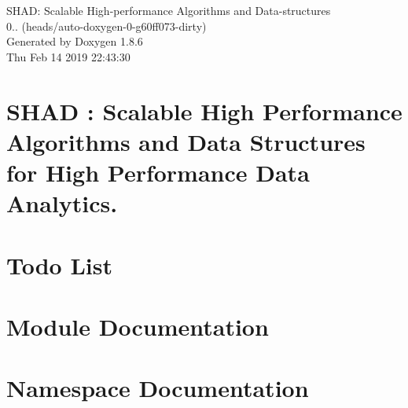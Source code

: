 \documentclass[twoside]{book}
\newcommand{\clearemptydoublepage}{%
  \newpage{\pagestyle{empty}\cleardoublepage}%
}
\begin{document}
\hypersetup{pageanchor=false}
\begin{titlepage}
\vspace*{7cm}
\begin{center}%
{\Large S\-H\-A\-D\-: Scalable High-\/performance Algorithms and Data-\/structures \\[1ex]\large 0.. (heads/auto-\/doxygen-\/0-\/g60ff073-\/dirty) }\\
\vspace*{1cm}
{\large Generated by Doxygen 1.8.6}\\
\vspace*{0.5cm}
{\small Thu Feb 14 2019 22:43:30}\\
\end{center}
\end{titlepage}
\clearemptydoublepage
\tableofcontents
\clearemptydoublepage
{}
\hypersetup{pageanchor=true}

\chapter{S\-H\-A\-D \-: Scalable High Performance Algorithms and Data Structures for High Performance Data Analytics.}
\label{index}\hypertarget{index}{}
\chapter{Todo List}
\label{todo}
\hypertarget{todo}{}

\chapter{Module Documentation}










\chapter{Namespace Documentation}


\end{document}
